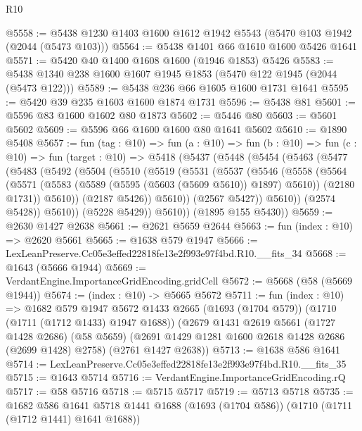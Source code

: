 \begin{lexlean}{R10}
\begin{coremodule}
@5558 := @5438 @1230 @1403 @1600 @1612 @1942 @5543 (@5470 @103 @1942 (@2044 (@5473 @103)))
@5564 := @5438 @1401 @66 @1610 @1600 @5426 @1641
@5571 := @5420 @40 @1400 @1608 @1600 (@1946 @1853) @5426
@5583 := @5438 @1340 @238 @1600 @1607 @1945 @1853 (@5470 @122 @1945 (@2044 (@5473 @122)))
@5589 := @5438 @236 @66 @1605 @1600 @1731 @1641
@5595 := @5420 @39 @235 @1603 @1600 @1874 @1731
@5596 := @5438 @81
@5601 := @5596 @83 @1600 @1602 @80 @1873
@5602 := @5446 @80
@5603 := @5601 @5602
@5609 := @5596 @66 @1600 @1600 @80 @1641 @5602
@5610 := @1890 @5408
@5657 := fun (tag : @10) =>
  fun (a : @10) =>
  fun (b : @10) =>
  fun (c : @10) =>
  fun (target : @10) =>
  @5418
    (@5437
      (@5448
        (@5454
          (@5463
            (@5477
              (@5483
                (@5492
                  (@5504
                    (@5510
                      (@5519
                        (@5531
                          (@5537
                            (@5546
                              (@5558
                                (@5564
                                  (@5571
                                    (@5583 (@5589 (@5595 (@5603 (@5609 @5610)) @1897) @5610))
                                    (@2180 @1731))
                                  @5610))
                              (@2187 @5426))
                            @5610))
                        (@2567 @5427))
                      @5610))
                  (@2574 @5428))
                @5610))
            (@5228 @5429))
          @5610))
      (@1895 @155 @5430))
@5659 := @2630 @1427 @2638
@5661 := @2621 @5659 @2644
@5663 := fun (index : @10) => @2620 @5661
@5665 := @1638 @579 @1947
@5666 := LexLeanPreserve.Cc05e3effed22818fe13e2f993e97f4bd.R10.__fits_34
@5668 := @1643 (@5666 @1944)
@5669 := VerdantEngine.ImportanceGridEncoding.gridCell
@5672 := @5668 (@58 (@5669 @1944))
@5674 := (index : @10) -> @5665 @5672
@5711 := fun (index : @10) =>
  @1682
    @579
    @1947
    @5672
    @1433
    @2665
    (@1693 (@1704 @579))
    (@1710 (@1711 (@1712 @1433) @1947 @1688))
    (@2679
      @1431
      @2619
      @5661
      (@1727 @1428 @2686)
      (@58 @5659)
      (@2691 @1429 @1281 @1600 @2618 @1428 @2686 (@2699 @1428) @2758)
      (@2761 @1427 @2638))
@5713 := @1638 @586 @1641
@5714 := LexLeanPreserve.Cc05e3effed22818fe13e2f993e97f4bd.R10.__fits_35
@5715 := @1643 @5714
@5716 := VerdantEngine.ImportanceGridEncoding.rQ
@5717 := @58 @5716
@5718 := @5715 @5717
@5719 := @5713 @5718
@5735 := @1682
    @586
    @1641
    @5718
    @1441
    @1688
    (@1693 (@1704 @586))
    (@1710 (@1711 (@1712 @1441) @1641 @1688))

\end{coremodule}
\end{lexlean}

